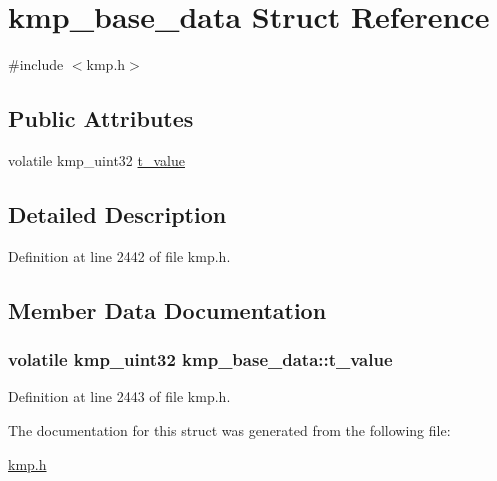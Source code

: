 \hypertarget{structkmp__base__data}{\section{kmp\-\_\-base\-\_\-data Struct Reference}
\label{structkmp__base__data}
}


{\ttfamily \#include $<$kmp.\-h$>$}

\subsection*{Public Attributes}
\begin{DoxyCompactItemize}
\item 
volatile kmp\-\_\-uint32 \hyperlink{structkmp__base__data_af2a806148984540b65b4043fbd2bd53c}{t\-\_\-value}
\end{DoxyCompactItemize}


\subsection{Detailed Description}


Definition at line 2442 of file kmp.\-h.



\subsection{Member Data Documentation}
\hypertarget{structkmp__base__data_af2a806148984540b65b4043fbd2bd53c}{
\subsubsection[{t\-\_\-value}]{\setlength{\rightskip}{0pt plus 5cm}volatile kmp\-\_\-uint32 kmp\-\_\-base\-\_\-data\-::t\-\_\-value}}\label{structkmp__base__data_af2a806148984540b65b4043fbd2bd53c}


Definition at line 2443 of file kmp.\-h.



The documentation for this struct was generated from the following file\-:\begin{DoxyCompactItemize}
\item 
\hyperlink{kmp_8h}{kmp.\-h}\end{DoxyCompactItemize}
